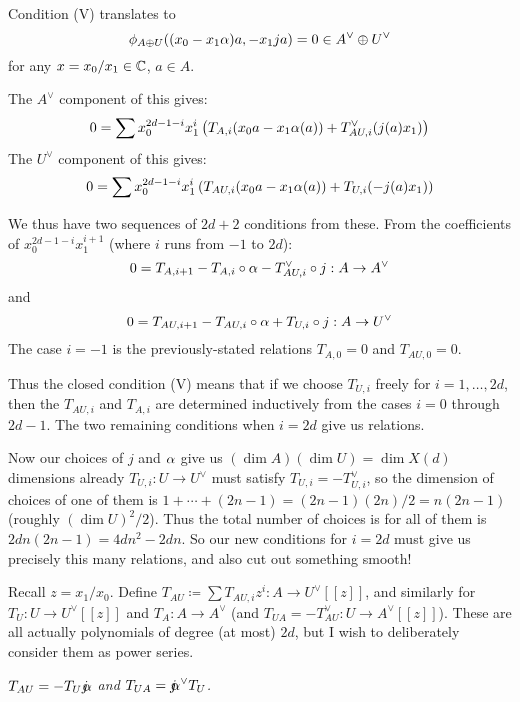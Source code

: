 {Condition (V) translates to
$$
\phi_{A \oplus U}(  (x_0-x_1 \alpha) a, -x_1 ja) =0 \in A^\vee \oplus U^\vee$$
for any $x =x_0/x_1 \in \mathbb{C}$, $a \in A$.  

The $A^\vee$ component of this gives:
$$
0 = \sum x_0^{2d-1-i} x_1^i \left( T_{A,i} (x_0a -x_1 \alpha(a)) +  T_{AU,i}^\vee  (j(a) x_1) \right)
$$
The $U^\vee$ component of this gives:
$$0 = \sum x_0^{2d-1-i} x_1^i \left( T_{AU,i} (x_0a -x_1 \alpha(a)) +  T_{U,i}  (-j(a) x_1) \right)
$$

We thus have two sequences of $2d+2$ conditions from these.   From the coefficients of $x_0^{2d-1-i} x_1^{i+1}$ (where $i$ runs from $-1$ to $2d$):
\begin{equation}\label{eq:TArecursion}
  0 = T_{A, i+1} - T_{A,i} \circ \alpha - T_{AU,i}^\vee \circ j : A \rightarrow A^\vee
  \end{equation}
and
\begin{equation}\label{eq:TAUrecursion}
  0 = T_{AU, i+1}   - T_{AU,i} \circ \alpha + T_{U,i} \circ j: A \rightarrow U^\vee
  \end{equation}
The  case $i=-1$ is the previously-stated relations $T_{A,0}=0$ and $T_{AU,0}=0$.

Thus the closed condition (V) means that if we choose $T_{U,i}$ freely for $i=1, \dots, 2d$,
then the $T_{AU,i}$ and $T_{A,i}$ are determined inductively from the cases $i=0$ through $2d-1$.
The two remaining conditions when $i=2d$ give us relations.

Now our choices of $j$ and $\alpha$ give us $(\dim A)(\dim U) = \dim X(d)$ dimensions already
$T_{U,i}:U \rightarrow U^\vee$ must satisfy $T_{U,i} = - T_{U, i}^\vee$, so the dimension
of choices of one of them is $1 + \cdots+ (2n-1) = (2n-1)(2n)/2= n(2n-1)$ (roughly $(\dim U)^2/2$).
Thus the total number of choices is for all of them is $2dn(2n-1)=4dn^2-2dn$.
So our new conditions for $i=2d$ must give us precisely this many relations, and also cut out something smooth!



Recall $z=x_1/x_0$.  Define $\boxed{T_{AU}} \coloneq \sum T_{AU,i} z^i :  A \rightarrow U^\vee[[z]]$, and similarly for $\boxed{T_U} : U \rightarrow U^\vee[[z]]$ and $\boxed{T_A}: A \rightarrow A^\vee$ (and $\boxed{T_{UA}} = -T_{AU}^\vee: U \rightarrow A^\vee[[z]]$).  These are all actually polynomials of degree (at most) $2d$, but I wish to deliberately consider them as power series.

  {\em $T_{AU} = - T_U \mathord{j\mkern-7mu\alpha}$ and $T_{UA} = \mathord{j\mkern-7mu\alpha}^\vee T_U$.}

}
